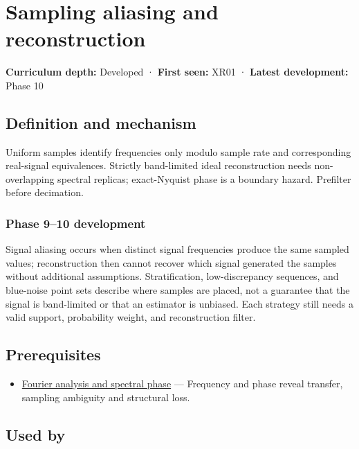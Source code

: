 \hypertarget{appendix-6a7869dd79a6}{}\label{referencestart:appendix-6a7869dd79a6}
\section{Sampling aliasing and reconstruction}\label{appendix-6a7869dd79a6-sampling-aliasing-and-reconstruction}

\textbf{Curriculum depth:} Developed · \textbf{First seen:} XR01 · \textbf{Latest development:} Phase 10

\subsection{Definition and mechanism}\label{appendix-6a7869dd79a6-definition-and-mechanism}

Uniform samples identify frequencies only modulo sample rate and corresponding real-signal equivalences. Strictly band-limited ideal reconstruction needs non-overlapping spectral replicas; exact-Nyquist phase is a boundary hazard. Prefilter before decimation.

\subsubsection{Phase 9--10 development}\label{appendix-6a7869dd79a6-phase-910-development}

Signal aliasing occurs when distinct signal frequencies produce the same sampled values; reconstruction then cannot recover which signal generated the samples without additional assumptions. Stratification, low-discrepancy sequences, and blue-noise point sets describe where samples are placed, not a guarantee that the signal is band-limited or that an estimator is unbiased. Each strategy still needs a valid support, probability weight, and reconstruction filter.

\subsection{Prerequisites}\label{appendix-6a7869dd79a6-prerequisites}

\begin{itemize}
\tightlist
\item
  \hyperref[appendix-b60686ba06a1]{Fourier analysis and spectral phase} --- Frequency and phase reveal transfer, sampling ambiguity and structural loss.
\end{itemize}

\subsection{Used by}\label{appendix-6a7869dd79a6-used-by}

